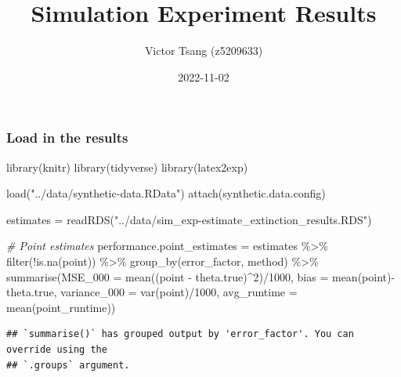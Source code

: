 \documentclass[
]{article}
\title{Simulation Experiment Results}
\author{Victor Tsang (z5209633)}
\date{2022-11-02}
\newenvironment{Shaded}{\begin{snugshade}}{\end{snugshade}}
\newcommand{\AttributeTok}[1]{\textcolor[rgb]{0.77,0.63,0.00}{#1}}
\newcommand{\CommentTok}[1]{\textcolor[rgb]{0.56,0.35,0.01}{\textit{#1}}}
\newcommand{\DecValTok}[1]{\textcolor[rgb]{0.00,0.00,0.81}{#1}}
\newcommand{\FunctionTok}[1]{\textcolor[rgb]{0.00,0.00,0.00}{#1}}
\newcommand{\NormalTok}[1]{#1}
\newcommand{\OtherTok}[1]{\textcolor[rgb]{0.56,0.35,0.01}{#1}}
\newcommand{\SpecialCharTok}[1]{\textcolor[rgb]{0.00,0.00,0.00}{#1}}
\newcommand{\StringTok}[1]{\textcolor[rgb]{0.31,0.60,0.02}{#1}}
\begin{document}
\maketitle

\hypertarget{load-in-the-results}{%
\subsubsection{Load in the results}\label{load-in-the-results}}

\begin{Shaded}
\begin{Highlighting}[]
\FunctionTok{library}\NormalTok{(knitr)}
\FunctionTok{library}\NormalTok{(tidyverse)}
\FunctionTok{library}\NormalTok{(latex2exp)}

\FunctionTok{load}\NormalTok{(}\StringTok{"../data/synthetic{-}data.RData"}\NormalTok{)}
\FunctionTok{attach}\NormalTok{(synthetic.data.config)}

\NormalTok{estimates }\OtherTok{=} \FunctionTok{readRDS}\NormalTok{(}\StringTok{"../data/sim\_exp{-}estimate\_extinction\_results.RDS"}\NormalTok{)}
\end{Highlighting}
\end{Shaded}

\begin{Shaded}
\begin{Highlighting}[]
\CommentTok{\# Point estimates}
\NormalTok{performance.point\_estimates }\OtherTok{=}\NormalTok{ estimates }\SpecialCharTok{\%\textgreater{}\%}
  \FunctionTok{filter}\NormalTok{(}\SpecialCharTok{!}\FunctionTok{is.na}\NormalTok{(point)) }\SpecialCharTok{\%\textgreater{}\%}
  \FunctionTok{group\_by}\NormalTok{(error\_factor, method) }\SpecialCharTok{\%\textgreater{}\%}
  \FunctionTok{summarise}\NormalTok{(}\AttributeTok{MSE\_000 =} \FunctionTok{mean}\NormalTok{((point }\SpecialCharTok{{-}}\NormalTok{ theta.true)}\SpecialCharTok{\^{}}\DecValTok{2}\NormalTok{)}\SpecialCharTok{/}\DecValTok{1000}\NormalTok{,}
            \AttributeTok{bias =} \FunctionTok{mean}\NormalTok{(point)}\SpecialCharTok{{-}}\NormalTok{theta.true,}
            \AttributeTok{variance\_000 =} \FunctionTok{var}\NormalTok{(point)}\SpecialCharTok{/}\DecValTok{1000}\NormalTok{,}
            \AttributeTok{avg\_runtime =} \FunctionTok{mean}\NormalTok{(point\_runtime))}
\end{Highlighting}
\end{Shaded}

\begin{verbatim}
## `summarise()` has grouped output by 'error_factor'. You can override using the
## `.groups` argument.
\end{verbatim}
\end{document}
